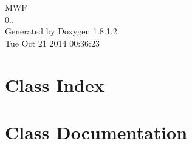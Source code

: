 \documentclass{book}
\begin{document}
\hypersetup{pageanchor=false,citecolor=blue}
\begin{titlepage}
\vspace*{7cm}
\begin{center}
{\Large M\-W\-F \\[1ex]\large 0.. }\\
\vspace*{1cm}
{\large Generated by Doxygen 1.8.1.2}\\
\vspace*{0.5cm}
{\small Tue Oct 21 2014 00:36:23}\\
\end{center}
\end{titlepage}
\clearemptydoublepage
{}
\tableofcontents
\clearemptydoublepage
{}
\hypersetup{pageanchor=true,citecolor=blue}
\chapter{Class Index}

\chapter{Class Documentation}

















\printindex
\end{document}
